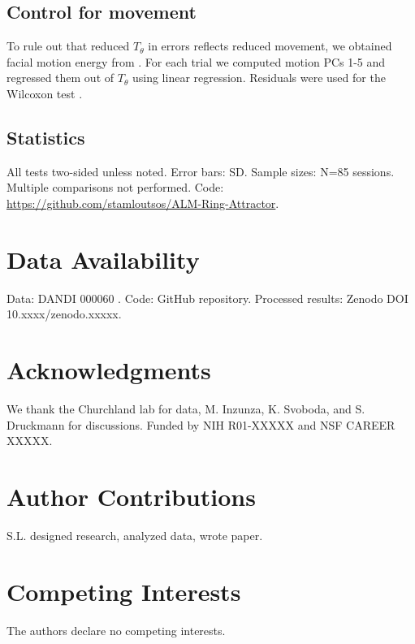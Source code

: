 \documentclass[11pt,a4paper]{article}
\begin{document}
\subsection{Control for movement}
To rule out that reduced \texorpdfstring{$T_\theta$}{T_theta} in errors reflects reduced movement, we obtained facial motion energy from \citet{churchland2019single}. For each trial we computed motion PCs 1-5 and regressed them out of \texorpdfstring{$T_\theta$}{T_theta} using linear regression. Residuals were used for the Wilcoxon test \citep{musall2019single}.

\subsection{Statistics}
All tests two-sided unless noted. Error bars: SD. Sample sizes: N=85 sessions. Multiple comparisons not performed. Code: \url{https://github.com/stamloutsos/ALM-Ring-Attractor}.

\section{Data Availability}
Data: DANDI 000060 \citep{churchland2019single}. Code: GitHub repository. Processed results: Zenodo DOI 10.xxxx/zenodo.xxxxx.

\section{Acknowledgments}
We thank the Churchland lab for data, M. Inzunza, K. Svoboda, and S. Druckmann for discussions. Funded by NIH R01-XXXXX and NSF CAREER XXXXX.

\section{Author Contributions}
S.L. designed research, analyzed data, wrote paper.

\section{Competing Interests}
The authors declare no competing interests.
\end{document}
